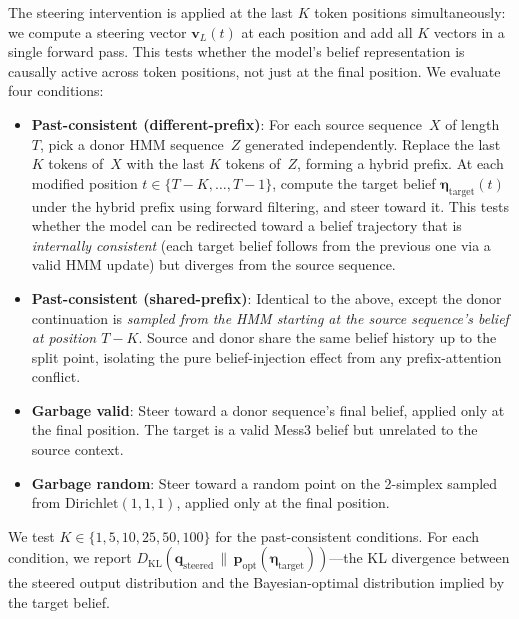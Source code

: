\documentclass[midterm]{sparreport}
\begin{document}
The steering intervention is applied at the last $K$ token positions simultaneously: we compute a steering vector $\mathbf{v}_L(t)$ at each position and add all $K$ vectors in a single forward pass. This tests whether the model's belief representation is causally active across token positions, not just at the final position. We evaluate four conditions:
\begin{itemize}
  \item \textbf{Past-consistent (different-prefix)}: For each source sequence~$X$ of length~$T$, pick a donor HMM sequence~$Z$ generated independently. Replace the last $K$ tokens of~$X$ with the last $K$ tokens of~$Z$, forming a hybrid prefix. At each modified position $t \in \{T{-}K, \ldots, T{-}1\}$, compute the target belief $\boldsymbol{\eta}_{\mathrm{target}}(t)$ under the hybrid prefix using forward filtering, and steer toward it. This tests whether the model can be redirected toward a belief trajectory that is \emph{internally consistent} (each target belief follows from the previous one via a valid HMM update) but diverges from the source sequence.
  \item \textbf{Past-consistent (shared-prefix)}: Identical to the above, except the donor continuation is \emph{sampled from the HMM starting at the source sequence's belief at position $T{-}K$}. Source and donor share the same belief history up to the split point, isolating the pure belief-injection effect from any prefix-attention conflict.
  \item \textbf{Garbage valid}: Steer toward a donor sequence's final belief, applied only at the final position. The target is a valid Mess3 belief but unrelated to the source context.
  \item \textbf{Garbage random}: Steer toward a random point on the 2-simplex sampled from $\mathrm{Dirichlet}(1,1,1)$, applied only at the final position.
\end{itemize}
We test $K \in \{1, 5, 10, 25, 50, 100\}$ for the past-consistent conditions. For each condition, we report $D_{\mathrm{KL}}(\mathbf{q}_{\mathrm{steered}} \,\|\, \mathbf{p}_{\mathrm{opt}}(\boldsymbol{\eta}_{\mathrm{target}}))$---the KL divergence between the steered output distribution and the Bayesian-optimal distribution implied by the target belief.
\end{document}
